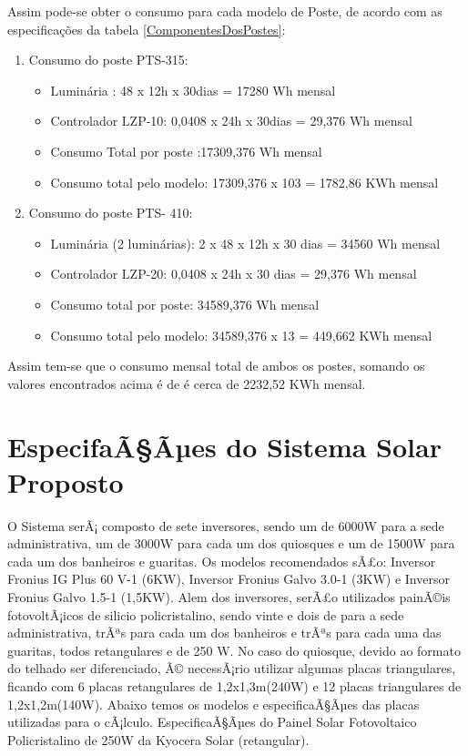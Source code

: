 	Assim pode-se obter o consumo para cada modelo de Poste, de acordo com as especifica\c{c}\~oes  da tabela \ref{ComponentesDosPostes}:
	
\begin{enumerate}
         \item Consumo do poste PTS-315:
                  \begin{itemize}
                            \item Lumin\'aria : 48 x 12h x 30dias = 17280 Wh mensal
                            \item Controlador LZP-10: 0,0408 x 24h x 30dias = 29,376 Wh mensal 
                            \item Consumo Total por poste :17309,376 Wh mensal
                            \item Consumo total pelo modelo: 17309,376 x 103 = 1782,86 KWh mensal
                  \end{itemize}
         \item Consumo do poste PTS- 410:
                  \begin{itemize}
                            \item Lumin\'aria (2 lumin\'arias): 2 x 48 x 12h x 30 dias = 34560 Wh mensal
                            \item Controlador LZP-20:  0,0408 x 24h x 30 dias = 29,376 Wh mensal  
                            \item Consumo total por poste: 34589,376 Wh mensal
                            \item Consumo total pelo modelo:  34589,376 x 13 = 449,662 KWh mensal
                  \end{itemize}
\end{enumerate}

	Assim tem-se que o consumo mensal total de ambos os postes, somando os valores encontrados acima \'e de  \'e cerca de 2232,52 KWh mensal.
	
\chapter{EspecifaÃ§Ãµes do Sistema Solar Proposto}

O Sistema serÃ¡ composto de sete inversores, sendo um de 6000W para a sede administrativa, um de 3000W para cada um dos quiosques e um de 1500W para cada um dos banheiros e guaritas. Os modelos recomendados sÃ£o: Inversor Fronius IG Plus 60 V-1 (6KW), Inversor Fronius Galvo 3.0-1 (3KW) e Inversor Fronius Galvo 1.5-1 (1,5KW).
	Alem dos inversores, serÃ£o utilizados painÃ©is fotovoltÃ¡icos de silicio policristalino, sendo vinte e dois de para a sede administrativa, trÃªs para cada um dos banheiros e trÃªs para cada uma das guaritas, todos retangulares e de 250 W. No caso do quiosque, devido ao formato do telhado ser diferenciado, Ã© necessÃ¡rio utilizar algumas placas triangulares, ficando com 6 placas retangulares de 1,2x1,3m(240W) e 12 placas triangulares de 1,2x1,2m(140W). Abaixo temos os modelos e especificaÃ§Ãµes das placas utilizadas para o cÃ¡lculo.
	EspecificaÃ§Ãµes do Painel Solar Fotovoltaico Policristalino de 250W da Kyocera Solar (retangular).
	
